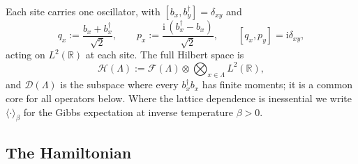 \documentclass[11pt]{article}
\numberwithin{equation}{section}
\newcommand{\ii}{\mathrm{i}}
\newcommand{\R}{\mathbb{R}}
\newcommand{\Lamb}{\Lambda}
\theoremstyle{definition}
\begin{document}
Each site carries one oscillator, with $[b_{x},b_{y}^{\dagger}]=\delta_{xy}$ and
\begin{equation}
q_{x}:=\frac{b_{x}+b_{x}^{\dagger}}{\sqrt2},\qquad
p_{x}:=\frac{\ii\,(b_{x}^{\dagger}-b_{x})}{\sqrt2},\qquad [q_{x},p_{y}]=\ii\delta_{xy},
\end{equation}
acting on $L^{2}(\R)$ at each site. The full Hilbert space is
\begin{equation}
\mathcal{H}(\Lamb):=\mathcal{F}(\Lamb)\otimes\bigotimes_{x\in\Lamb}L^{2}(\R),
\end{equation}
and $\mathcal{D}(\Lamb)$ is the subspace where every $b_{x}^{\dagger}b_{x}$ has finite
moments; it is a common core for all operators below. Where the lattice dependence is
inessential we write $\langle\cdot\rangle_{\beta}$ for the Gibbs expectation at inverse
temperature $\beta>0$.

\subsection{The Hamiltonian}
\end{document}
